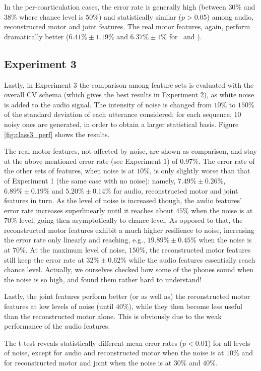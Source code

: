 In the per-coarticulation cases, the error rate is generally high (between $30\%$ and $38\%$
where chance level is $50\%$) and statistically similar ($p>0.05$) among audio, reconstructed
motor and joint features. The real motor features, again, perform dramatically better
($6.41\% \pm 1.19\%$ and $6.37\% \pm 1\%$ for \coa\ and \cob).

\subsection{Experiment 3}
\label{subsec:exp3}

Lastly, in Experiment 3 the comparison among feature sets is evaluated with the
overall CV schema (which gives the best results in Experiment 2), as white noise is added
to the audio signal. The intensity of noise is changed from $10\%$ to $150\%$ of
the standard deviation of each utterance considered; for each sequence, $10$ noisy
ones are generated, in order to obtain a larger statistical basis.
Figure \ref{fig:class3_perf} shows the results.

The real motor features, not affected by noise, are shown as comparison, and stay at
the above mentioned error rate (see Experiment 1) of $0.97\%$. The error rate of the
other sets of features, when noise is at $10\%$, is only slightly worse than that of
Experiment 1 (the same case with no noise): namely,
$7.49\% \pm 0.26\%$, 
$6.89\% \pm 0.19\%$ and 
$5.20\% \pm 0.14\%$ for audio, reconstructed motor and joint features in turn.
As the level of noise is increased though, the audio features' error rate
increases superlinearly until it reaches about $45\%$ when the noise is at $70\%$
level, going then asymptotically to chance level. As opposed to that, the reconstructed
motor features exhibit a much higher resilience to noise, increasing the error rate
only linearly and reaching, e.g., $19.89\% \pm 0.45\%$ when the noise is at $70\%$.
At the maximum level of noise, $150\%$, the reconstructed motor features still keep
the error rate at $32\% \pm 0.62\%$ while the audio features essentially reach chance
level. Actually, we ourselves checked how some of the phones sound when the noise is
so high, and found them rather hard to understand!

Lastly, the joint features perform better (or as well as) the reconstructed motor features
at low levels of noise (until $40\%$), while they then become less useful than the
reconstructed motor alone. This is obviously due to the weak performance of the audio
features.

The t-test reveals statistically different mean error rates ($p<0.01$) for all levels of
noise, except for audio and reconstructed motor when the noise
is at $10\%$ and for reconstructed motor and joint when the noise is at $30\%$
and $40\%$.
